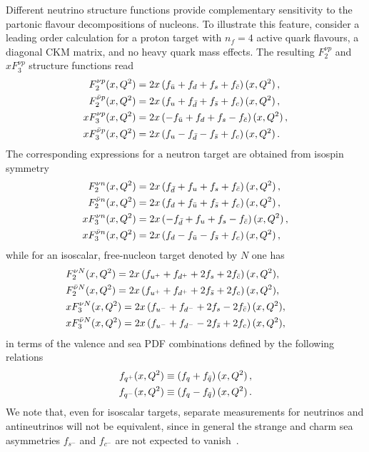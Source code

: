 Different neutrino structure functions provide complementary sensitivity
 to the partonic flavour decompositions of nucleons.
 To illustrate this feature, consider a leading order  calculation
 for a proton target with $n_f=4$ active quark flavours,
a diagonal CKM matrix, and no heavy quark mass effects.
 The resulting $F_2^{\nu p}$ and $xF_3^{\nu p}$ structure functions read
\begin{align}
	 F_2^{\nu p}(x,Q^2) &= 2x\left( f_{\bar{u}} + f_{d} + f_{s} + f_{\bar{c}} \right)(x,Q^2) \, , \nonumber  \\
	F_2^{\bar{\nu} p}(x,Q^2) &= 2x\left( f_u + f_{\bar{d}} + f_{\bar{s}} + f_c \right)(x,Q^2) \, , \label{eq:neutrinoSFs_proton} \\
	xF_3^{\nu p}(x,Q^2) &= 2x\left( -f_{\bar{u}} + f_d +f_s - f_{\bar{c}}\right)(x,Q^2)  \, , \nonumber\\
	xF_3^{\bar{\nu} p}(x,Q^2) &= 2x\left( f_u - f_{\bar{d}} -f_{\bar{s}} + f_{c}\right)(x,Q^2) \, . \nonumber
\end{align}
 The corresponding expressions for a neutron target are obtained from isospin symmetry
 \begin{align}
 	 F_2^{\nu n}(x,Q^2) &= 2x\left( f_{\bar{d}} + f_{u} + f_{s} + f_{\bar{c}} \right)(x,Q^2) \, , \nonumber  \\
 	F_2^{\bar{\nu} n}(x,Q^2) &= 2x\left( f_d + f_{\bar{u}} + f_{\bar{s}} + f_c \right)(x,Q^2) \, , \label{eq:antineutrinoSFs_neutron} \\
 	xF_3^{\nu n}(x,Q^2) &= 2x\left( -f_{\bar{d}} + f_u +f_s - f_{\bar{c}}\right)(x,Q^2)  \, , \nonumber\\
 	xF_3^{\bar{\nu} n}(x,Q^2) &= 2x\left( f_d - f_{\bar{u}} -f_{\bar{s}} + f_{c}\right)(x,Q^2) \, , \nonumber
 \end{align}
 while for an isoscalar, free-nucleon target denoted by $N$ one has
 \begin{align}
 	\noindent
 	&F_2^{\nu N}(x,Q^2)= 2x\lp f_{u^+} + f_{d^+} + 2f_s + 2f_{\bar{c}} \rp(x,Q^2), \nonumber  \\
 	&F_2^{\bar{\nu} N}(x,Q^2)= 2x\lp f_{u^+} + f_{d^+} + 2f_{\bar{s}} + 2f_c \rp(x,Q^2), \label{eq:neutrinoSFs_isoscalar} \\
 	&xF_3^{\nu N}(x,Q^2)= 2x\lp f_{u^-} + f_{d^-} +2f_s - 2f_{\bar{c}}\rp(x,Q^2), \nonumber\\
 	&xF_3^{\bar{\nu} N}(x,Q^2)= 2x\lp   f_{u^-} + f_{d^-}-2f_{\bar{s}} +2 f_{c}\rp(x,Q^2), \nonumber \qquad
 \end{align}
 in terms of the valence and sea PDF combinations defined by the following relations
\begin{align}
	 f_{q^+} (x,Q^2) &\equiv \left( f_{q}+f_{\bar{q}}\right)(x,Q^2) \, , \nonumber \\
	f_{q^-} (x,Q^2) &\equiv \left( f_{q}- f_{\bar{q}}\right)(x,Q^2) \, .
\end{align}
 We note that, even for isoscalar targets, separate measurements
 for neutrinos and antineutrinos will not be equivalent, since in general
 the strange and charm sea asymmetries $f_{s^-}$ and
 $f_{c^-}$ are not expected to vanish~\cite{Sufian:2018cpj,Sufian:2020coz}.


